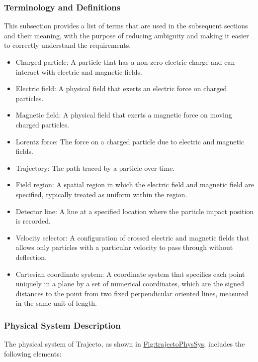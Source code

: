 \documentclass[12pt]{article}
\begin{document}
\subsubsection{Terminology and Definitions}
\label{Sec:TermDefs}
This subsection provides a list of terms that are used in the subsequent sections and their meaning, with the purpose of reducing ambiguity and making it easier to correctly understand the requirements.

\begin{itemize}
\item{Charged particle: A particle that has a non-zero electric charge and can interact with electric and magnetic fields.}
\item{Electric field: A physical field that exerts an electric force on charged particles.}
\item{Magnetic field: A physical field that exerts a magnetic force on moving charged particles.}
\item{Lorentz force: The force on a charged particle due to electric and magnetic fields.}
\item{Trajectory: The path traced by a particle over time.}
\item{Field region: A spatial region in which the electric field and magnetic field are specified, typically treated as uniform within the region.}
\item{Detector line: A line at a specified location where the particle impact position is recorded.}
\item{Velocity selector: A configuration of crossed electric and magnetic fields that allows only particles with a particular velocity to pass through without deflection.}
\item{Cartesian coordinate system: A coordinate system that specifies each point uniquely in a plane by a set of numerical coordinates, which are the signed distances to the point from two fixed perpendicular oriented lines, measured in the same unit of length.}
\end{itemize}
\subsubsection{Physical System Description}
\label{Sec:PhysSyst}
The physical system of Trajecto, as shown in \hyperref[Figure:trajectoPhysSys]{Fig:trajectoPhysSys}, includes the following elements:
\end{document}
